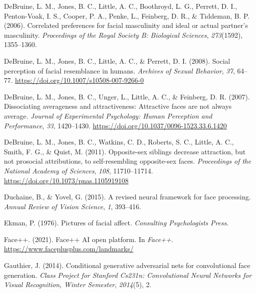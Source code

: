 \documentclass[
  doc,floatsintext]{apa6}
\newlength{\cslhangindent}
\newlength{\cslentryspacingunit} %
\newenvironment{CSLReferences}[2] %
 {%
  \setlength{\parindent}{0pt}
  \ifodd #1
  \let\oldpar\par
  \def\par{\hangindent=\cslhangindent\oldpar}
  \fi
  \setlength{\parskip}{#2\cslentryspacingunit}
 }%
 {}
\begin{document}
\begin{CSLReferences}{1}{0}
\leavevmode{}%
DeBruine, L. M., Jones, B. C., Little, A. C., Boothroyd, L. G., Perrett, D. I., Penton-Voak, I. S., Cooper, P. A., Penke, L., Feinberg, D. R., \& Tiddeman, B. P. (2006). Correlated preferences for facial masculinity and ideal or actual partner's masculinity. \emph{Proceedings of the Royal Society B: Biological Sciences}, \emph{273}(1592), 1355--1360.

\leavevmode{}%
DeBruine, L. M., Jones, B. C., Little, A. C., \& Perrett, D. I. (2008). Social perception of facial resemblance in humans. \emph{Archives of Sexual Behavior}, \emph{37}, 64--77. \url{https://doi.org/10.1007/s10508-007-9266-0}

\leavevmode{}%
DeBruine, L. M., Jones, B. C., Unger, L., Little, A. C., \& Feinberg, D. R. (2007). Dissociating averageness and attractiveness: Attractive faces are not always average. \emph{Journal of Experimental Psychology: Human Perception and Performance}, \emph{33}, 1420--1430. \url{https://doi.org/10.1037/0096-1523.33.6.1420}

\leavevmode{}%
DeBruine, L. M., Jones, B. C., Watkins, C. D., Roberts, S. C., Little, A. C., Smith, F. G., \& Quist, M. (2011). Opposite-sex siblings decrease attraction, but not prosocial attributions, to self-resembling opposite-sex faces. \emph{Proceedings of the National Academy of Sciences}, \emph{108}, 11710--11714. \url{https://doi.org/10.1073/pnas.1105919108}

\leavevmode{}%
Duchaine, B., \& Yovel, G. (2015). A revised neural framework for face processing. \emph{Annual Review of Vision Science}, \emph{1}, 393--416.

\leavevmode{}%
Ekman, P. (1976). Pictures of facial affect. \emph{Consulting Psychologists Press}.

\leavevmode{}%
Face++. (2021). Face++ AI open platform. In \emph{Face++}. \url{https://www.faceplusplus.com/landmarks/}

\leavevmode{}%
Gauthier, J. (2014). Conditional generative adversarial nets for convolutional face generation. \emph{Class Project for Stanford Cs231n: Convolutional Neural Networks for Visual Recognition, Winter Semester}, \emph{2014}(5), 2.


\end{CSLReferences}
\end{document}
